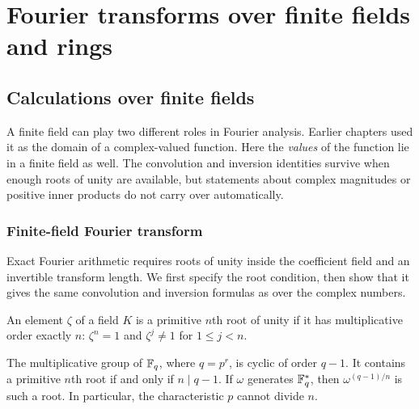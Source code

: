 \chapter{Fourier transforms over finite fields and rings}
\label{chap-extension-finite-field-values}

\section{Calculations over finite fields}
\label{sect1-calculations-finite-field}
A finite field can play two different roles in Fourier analysis. Earlier
chapters used it as the domain of a complex-valued function. Here the
\emph{values} of the function lie in a finite field as well. The convolution
and inversion identities survive when enough roots of unity are available,
but statements about complex magnitudes or positive inner products do not
carry over automatically.

\subsection{Finite-field Fourier transform}
\label{sect2-trans-fourier-finite-field}

Exact Fourier arithmetic requires roots of unity inside the coefficient
field and an invertible transform length. We first specify the root
condition, then show that it gives the same convolution and inversion
formulas as over the complex numbers.

\begin{defn}
An element $\zeta$ of a field $K$ is a primitive $n$th root of unity if
it has multiplicative order exactly $n$: $\zeta^n=1$ and
$\zeta^j\ne1$ for $1\leq j<n$.
\end{defn}
The multiplicative group of $\mathbb{F}_q$, where $q=p^r$, is cyclic of order
$q-1$. It contains a primitive $n$th root if and only if $n\mid q-1$.
If $\omega$ generates $\mathbb{F}_q^*$, then $\omega^{(q-1)/n}$ is such a root.
In particular, the characteristic $p$ cannot divide $n$.


